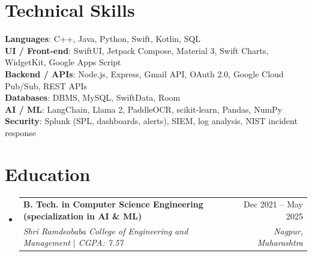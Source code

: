 \documentclass[a4paper,11pt]{article}
\makeatletter
\newcommand{\resumeSubheading}[4]{
  \vspace{-1pt}\item
    \begin{tabularx}{0.97\textwidth}[t]{@{}>{\raggedright\arraybackslash}X@{\hspace{0.75em}}r@{}}
      \textbf{#1} & #2 \\
      \textit{\small#3} & \textit{\small #4} \\
    \end{tabularx}\vspace{-3pt}
}
\newcommand{\resumeSubItemListStart}{\begin{itemize}[leftmargin=0.15in, label={}]}
\newcommand{\resumeSubItemListEnd}{\end{itemize}}
\makeatother
\begin{document}
\section{Technical Skills}
  \begin{itemize}[leftmargin=0.15in, label={}]
    \small{\item{
      \textbf{Languages}{: C++, Java, Python, Swift, Kotlin, SQL} \\
      \textbf{UI / Front-end}{: SwiftUI, Jetpack Compose, Material 3, Swift Charts, WidgetKit, Google Apps Script} \\
      \textbf{Backend / APIs}{: Node.js, Express, Gmail API, OAuth 2.0, Google Cloud Pub/Sub, REST APIs} \\
      \textbf{Databases}{: DBMS, MySQL, SwiftData, Room} \\
      \textbf{AI / ML}{: LangChain, Llama 2, PaddleOCR, scikit-learn, Pandas, NumPy} \\
      \textbf{Security}{: Splunk (SPL, dashboards, alerts), SIEM, log analysis, NIST incident response}
    }}
  \end{itemize}

\section{Education}
  \resumeSubItemListStart
    \resumeSubheading
      {B. Tech. in Computer Science Engineering (specialization in AI \& ML)}{Dec 2021 -- May 2025}
      {Shri Ramdeobaba College of Engineering and Management $|$ CGPA: 7.57}{Nagpur, Maharashtra}
  \resumeSubItemListEnd
\end{document}
